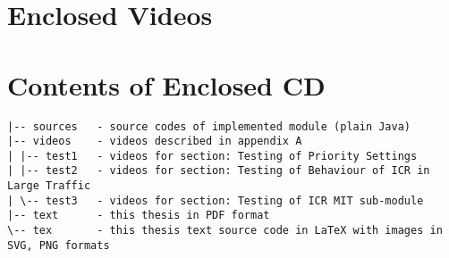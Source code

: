 
\appendix

\chapter{Enclosed Videos}



\chapter{Contents of Enclosed CD}


\begin{verbatim}
|-- sources   - source codes of implemented module (plain Java)
|-- videos    - videos described in appendix A
| |-- test1   - videos for section: Testing of Priority Settings
| |-- test2   - videos for section: Testing of Behaviour of ICR in Large Traffic
| \-- test3   - videos for section: Testing of ICR MIT sub-module
|-- text      - this thesis in PDF format
\-- tex       - this thesis text source code in LaTeX with images in SVG, PNG formats
\end{verbatim}